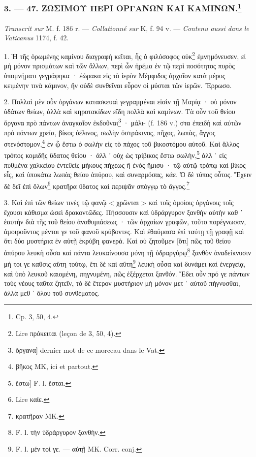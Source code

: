 \documentclass[a4paper, 11pt, oneside, polutonikogreek, french]{article}
\begin{document}
\bigskip
\centerline{\EightStarTaper}
\centerline{\EightStarTaper\EightStarTaper}
\bigskip

\subsubsection[3. --- 47. ΖΩΣΙΜΟΥ ΠΕΡΙ ΟΡΓΑΝΩΝ ΚΑΙ ΚΑΜΙΝΩΝ.]{3. --- 47. ΖΩΣΙΜΟΥ ΠΕΡΙ ΟΡΓΑΝΩΝ ΚΑΙ ΚΑΜΙΝΩΝ.\footnote{Cp. 3, 50, 4.}}
\paragraph{}
\emph{Transcrit sur} M. f. 186 r. --- \emph{Collationné sur} K, f. 94 v. --- \emph{Contenu aussi dans le Vaticanus} 1174, f. 42.

\bigskip

1. Ἡ τῆς ὁρωμένης καμίνου διαγραφὴ κεῖται, ἧς ὁ φιλόσοφος οὐκ\footnote{Lire πρόκειται (leçon de 3, 50, 4).} ἐμνημόνευσεν, εἰ μὴ μόνον πρισμάτων καὶ τῶν ἄλλων, περὶ ὧν ἠρέμα ἐν τῷ περὶ ποσότητος πυρὸς ὑπομνήματι γεγράφηκα · ἐώρακα εἰς τὸ ἱερὸν Μέμφιδος ἀρχαῖον κατὰ μέρος κειμένην τινὰ κάμινον, ἣν οὐδὲ συνθεῖναι εὗρον οἱ μύσται τῶν ἱερῶν. Ἔρρωσο.

2. Πολλαὶ μὲν οὖν ὀργάνων κατασκευαὶ γεγραμμέναι εἰσὶν τῇ Μαρίᾳ · οὐ μόνον ὑδάτων θείων, ἀλλὰ καὶ κηροτακίδων εἴδη πολλὰ καὶ καμίνων. Τὰ οὖν τοῦ θείου ὄργανα πρὸ πάντων ἀναγκαῖον ἐκδοῦναι\footnote{ὄργανα] dernier mot de ce morceau dans le Vat.} · μάλι- (f. 186 v.) στα ἐπειδὴ καὶ αὐτῶν πρὸ πάντων χρεία, βίκος ὑέλινος, σωλὴν ὀστράκινος, πῆχος, λωπὰς, ἄγγος στενόστομον,\footnote{βῆκος MK, ici et partout.} ἐν ᾧ ἔστω ὁ σωλὴν εἰς τὸ πάχος τοῦ βικοστόμου αὐτοῦ. Καὶ ἄλλος τρόπος κομιδῆς ὕδατος θείου · ἀλλ ᾽ οὐχ ὡς τρίβικος ἔστω σωλὴν,\footnote{ἔστω] F. l. ἔσται.} ἀλλ ᾽ εἰς πυθμένα χαλκείου ἐντεθεὶς μήκους πήχεως ἢ ἑνὸς ἥμισυ · τῷ αὐτῷ τρόπῳ καὶ βίκος εἷς, καὶ ὑποκάτω λωπὰς θείου ἀπύρου, καὶ συναρμόσας, κάε. Ὁ δὲ τύπος οὗτος. Ἔχειν δὲ δεῖ ἐπὶ ὅλων\footnote{Lire καίε.} κρατῆρα ὕδατος καὶ περιψᾶν σπόγγῳ τὸ ἄγγος.\footnote{κρατῆραν MK.}

3. Καὶ ἐπὶ τῶν θείων τινὲς τῷ φανῷ < χρῶνται > καὶ τοῖς ὁμοίοις ὀργάνοις τοῖς ἔχουσι κάθισμα ὡσεὶ δρακοντῶδες. Πήσσουσιν καὶ ὑδράργυρον ξανθὴν αὐτὴν καθ ᾽ ἑαυτὴν διὰ τῆς τοῦ θείου ἀναθυμιάσεως · τῶν ἀρχαίων γραφῶν, τοῦτο παρέγνωσαν, ἀμοιροῦντος μέντοι γε τοῦ φανοῦ κρύβοντες. Καὶ ἐθαύμασα ἐπὶ ταύτῃ τῇ γραφῇ καὶ ὅτι δύο μυστήρια ἐν αὐτῇ ἐκρύβη φανερά. Καὶ οὐ ζητοῦμεν [ὅτι] πῶς τοῦ θείου ἀπύρου λευκὴ οὖσα καὶ πάντα λευκαίνουσα μόνη τῇ ὑδραργύρῳ\footnote{F. l. τὴν ὑδράργυρον ξανθὴν.} ξανθὸν ἀναδείκνυσιν μή τοι γε καῦσις αὕτη τούτῳ, ἔτι δὲ καὶ αὕτη\footnote{F. l. μέν τοί γε. --- αὐτῇ MK. Corr. conj.} λευκὴ οὖσα καὶ δυνάμει καὶ ἐνεργείᾳ, καὶ ὑπὸ λευκοῦ καιομένη, πηγνυμένη, πῶς ἐξέρχεται ξανθόν. Ἔδει οὖν πρό γε πάντων τοὺς νέους ταῦτα ζητεῖν, τὸ δὲ ἕτερον μυστήριον μὴ μόνον μετ ᾽ αὐτοῦ πήγνυσθαι, ἀλλὰ μεθ ᾽ ὅλου τοῦ συνθέματος.
\end{document}
